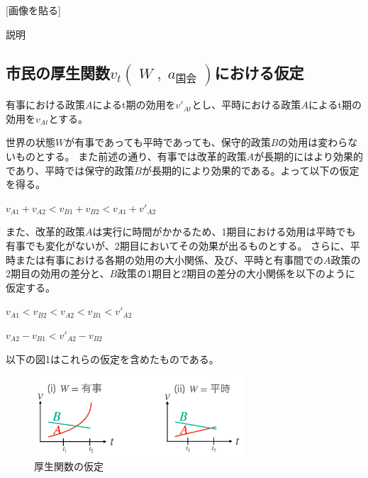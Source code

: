 \documentclass[main.tex]{subfiles}
\begin{document}
[画像を貼る]

説明


\subsection*{市民の厚生関数$v_t(\;W\;,\; a_\text{国会}\;)$における仮定}

有事における政策$A$によるt期の効用を$v'_{At}$とし、平時における政策$A$によるt期の効用を$v_{At}$とする。

世界の状態$W$が有事であっても平時であっても、保守的政策$B$の効用は変わらないものとする。
また前述の通り、有事では改革的政策$A$が長期的にはより効果的であり、平時では保守的政策$B$が長期的により効果的である。よって以下の仮定を得る。
\begin{assumption}  $v_{A1} + v_{A2}<v_{B1} + v_{B2} <  v_{A1} + v'_{A2}$ \end{assumption}


また、改革的政策$A$は実行に時間がかかるため、1期目における効用は平時でも有事でも変化がないが、2期目においてその効果が出るものとする。
さらに、平時または有事における各期の効用の大小関係、及び、平時と有事間での$A$政策の2期目の効用の差分と、$B$政策の1期目と2期目の差分の大小関係を以下のように仮定する。
\begin{assumption}  $v_{A1} < v_{B2} < v_{A2} < v_{B1} < v'_{A2}$  \end{assumption}
\begin{assumption}  $v_{A2} - v_{B1} < v'_{A2} - v_{B2}$  \end{assumption}

以下の図1はこれらの仮定を含めたものである。
\begin{figure}[htbp]
  \centering
  \includegraphics[width=0.7\textwidth]{./image/assumption_welfare_policy.png}
  \caption{厚生関数の仮定} 
  \label{fig:assumption_welfare_policy}
\end{figure}
\end{document}

